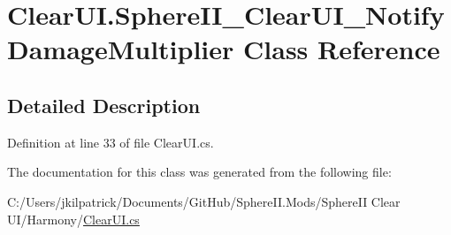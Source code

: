 \hypertarget{class_clear_u_i_1_1_sphere_i_i___clear_u_i___notify_damage_multiplier}{}\section{Clear\+U\+I.\+Sphere\+I\+I\+\_\+\+Clear\+U\+I\+\_\+\+Notify\+Damage\+Multiplier Class Reference}
\label{class_clear_u_i_1_1_sphere_i_i___clear_u_i___notify_damage_multiplier}


\subsection{Detailed Description}


Definition at line 33 of file Clear\+U\+I.\+cs.



The documentation for this class was generated from the following file\+:\begin{DoxyCompactItemize}
\item 
C\+:/\+Users/jkilpatrick/\+Documents/\+Git\+Hub/\+Sphere\+I\+I.\+Mods/\+Sphere\+I\+I Clear U\+I/\+Harmony/\mbox{\hyperlink{_clear_u_i_8cs}{Clear\+U\+I.\+cs}}\end{DoxyCompactItemize}

